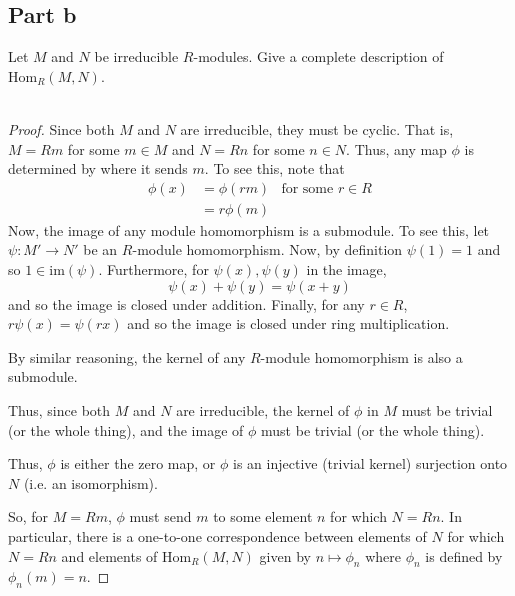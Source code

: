 \documentclass[12pt,reqno]{amsart}
\newcommand{\Hom}{\text{Hom}}
\newcommand{\im}{\text{im}}
\begin{document}
\subsection*{Part b}
Let $M$ and $N$ be irreducible $R$-modules. Give a complete description of
$\Hom_R(M,N)$.
\\
\\
\begin{proof}
    Since both $M$ and $N$ are irreducible, they must be cyclic. That is, $M=Rm$
    for some $m\in M$ and $N=Rn$ for some $n\in N$. Thus, any map $\phi$ is
    determined by where it sends $m$. To see this, note that
    \[
\begin{aligned}
    \phi(x) &= \phi(rm) &\text{for some $r\in R$}\\
            &= r\phi(m)
\end{aligned}
    \]
    Now, the image of any module homomorphism is a submodule. To see this, let
    $\psi:M'\to N'$ be an $R$-module homomorphism. Now, by definition $\psi(1) =
    1$ and so $1\in\im(\psi)$. Furthermore, for $\psi(x),\psi(y)$ in the image,
    \[
        \psi(x) + \psi(y) = \psi(x+y)
    \]
    and so the image is closed under addition. Finally, for any $r\in R$,
    $r\psi(x) = \psi(rx)$ and so the image is closed under ring multiplication.

    By similar reasoning, the kernel of any $R$-module homomorphism is also a
    submodule.

    Thus, since both $M$ and $N$ are irreducible, the kernel of $\phi$ in $M$
    must be trivial (or the whole thing), and the image of $\phi$ must be
    trivial (or the whole thing).

    Thus, $\phi$ is either the zero map, or $\phi$ is an injective (trivial
    kernel) surjection onto $N$ (i.e. an isomorphism).

    So, for $M=Rm$, $\phi$ must send $m$ to some element $n$ for which $N=Rn$.
    In particular, there is a one-to-one correspondence between elements of $N$
    for which $N=Rn$ and elements of $\Hom_R(M,N)$ given by $n\mapsto \phi_n$
    where $\phi_n$ is defined by $\phi_n(m) = n$.
\end{proof}
\end{document}
